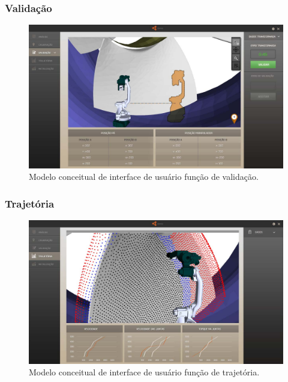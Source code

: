 \documentclass[12pt,a4paper]{article}
\begin{document}
\subsubsection {Validação}

\begin{figure}[H]
\begin{center}
  \includegraphics[width=.95\columnwidth]{figs/Validacao.jpg}
  \caption{Modelo conceitual de interface de usuário função de validação.}
  \label{fig:Interface de usuário para função de validação.}
\end{center}
\end{figure} 

\subsubsection {Trajetória}

\begin{figure}[H]
\begin{center}
  \includegraphics[width=\columnwidth]{figs/Trajetoria.jpg}
  \caption{Modelo conceitual de interface de usuário função de trajetória.}
  \label{fig:Interface de usuário para função de trajetória.}
\end{center}
\end{figure} 
\end{document}
